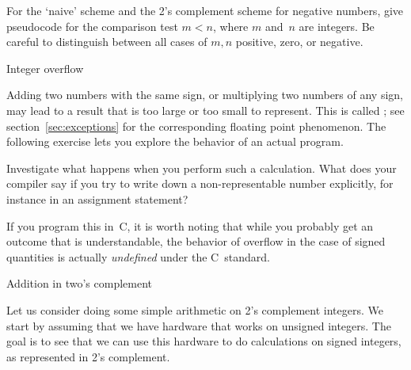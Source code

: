 \begin{exercise}
  \label{ex:compare-mn}
  For the `naive' scheme and the 2's complement scheme for negative
  numbers, give pseudocode for the comparison test $m<n$, where $m$
  and~$n$ are integers. Be careful to distinguish between all cases of
  $m,n$ positive, zero, or negative.
\end{exercise}

 {Integer overflow}

Adding two numbers with the same sign, or multiplying two numbers of
any sign, may lead to a result that is too
large or too small to represent. This is called ;
see section~\ref{sec:exceptions} for the corresponding floating
point phenomenon.
The following exercise lets you explore the behavior of an actual
program.

\begin{exercise}
  \label{ex:int-overflow}
  Investigate what happens when you perform such a calculation. What
  does your compiler say if you try to write down a non-representable
  number explicitly, for instance in an assignment statement?
\end{exercise}

If you program this in~C, it is worth noting that while you
probably get an outcome that is understandable, the behavior
of overflow in the case of signed quantities is actually
\emph{undefined}
under the C~standard.

 {Addition in two's complement}

Let us consider doing some simple arithmetic on 2's complement
integers. We start by assuming that we have hardware that works on unsigned integers.
The goal is to see that we can use this hardware to do calculations
on signed integers, as represented in 2's complement.

